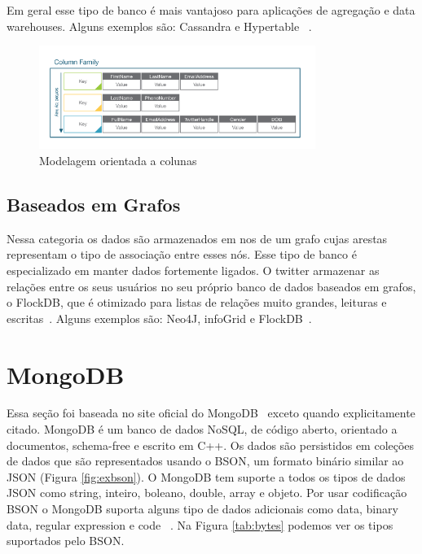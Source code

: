 Em geral esse tipo de banco é mais vantajoso para aplicações de agregação e data warehouses. Alguns exemplos são: Cassandra e  Hypertable ~\cite{nosqldatabaseorg}.



	\begin{figure}[!htbp]
		\begin{center}
			\includegraphics[width=0.8\textwidth]{columns}
		\end{center}
		\caption{Modelagem orientada a colunas}
		\label{fig:mdcolumns}
	\end{figure}


\subsection{Baseados em Grafos}

Nessa categoria os dados são armazenados em nos de um grafo cujas arestas representam o tipo de associação entre esses nós. Esse tipo de banco é especializado em manter dados fortemente ligados. O twitter armazenar as relações entre os seus usuários no seu próprio banco de dados baseados em grafos, o FlockDB, que é otimizado para listas de relações muito grandes, leituras e escritas~\cite{nosqlevaluation}.  Alguns exemplos são: Neo4J, infoGrid e FlockDB~\cite{nosqldatabaseorg}.

\section{MongoDB}\label{sec:mongo}

Essa seção foi baseada no site oficial do MongoDB~\cite{sitemongodb} exceto quando explicitamente citado.
MongoDB é um banco de dados NoSQL,  de código aberto,  orientado a documentos, schema-free e escrito em C++.  Os dados são persistidos em coleções de dados que são representados usando o BSON, um formato binário similar ao JSON (Figura \ref{fig:exbson}). O MongoDB tem suporte a todos os tipos de dados  JSON  como string, inteiro, boleano, double, array e objeto. Por usar codificação BSON o MongoDB suporta alguns tipo de dados adicionais como data, binary data, regular expression e code ~\cite{nosqlprofessional}. Na Figura \ref{tab:bytes} podemos ver os tipos suportados pelo BSON.

